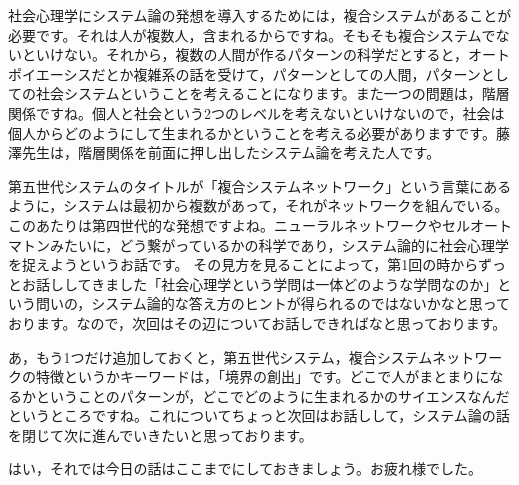 \documentclass{ltjsbook}
\begin{document}
社会心理学にシステム論の発想を導入するためには，複合システムがあることが必要です。それは人が複数人，含まれるからですね。そもそも複合システムでないといけない。それから，複数の人間が作るパターンの科学だとすると，オートポイエーシスだとか複雑系の話を受けて，パターンとしての人間，パターンとしての社会システムということを考えることになります。また一つの問題は，階層関係ですね。個人と社会という2つのレベルを考えないといけないので，社会は個人からどのようにして生まれるかということを考える必要がありますです。藤澤先生は，階層関係を前面に押し出したシステム論を考えた人です。

第五世代システムのタイトルが「複合システムネットワーク」という言葉にあるように，システムは最初から複数があって，それがネットワークを組んでいる。このあたりは第四世代的な発想ですよね。ニューラルネットワークやセルオートマトンみたいに，どう繋がっているかの科学であり，システム論的に社会心理学を捉えようというお話です。
その見方を見ることによって，第1回の時からずっとお話ししてきました「社会心理学という学問は一体どのような学問なのか」という問いの，システム論的な答え方のヒントが得られるのではないかなと思っております。なので，次回はその辺についてお話しできればなと思っております。

あ，もう1つだけ追加しておくと，第五世代システム，複合システムネットワークの特徴というかキーワードは，「境界の創出」です。どこで人がまとまりになるかということのパターンが，どこでどのように生まれるかのサイエンスなんだというところですね。これについてちょっと次回はお話しして，システム論の話を閉じて次に進んでいきたいと思っております。

はい，それでは今日の話はここまでにしておきましょう。お疲れ様でした。

\printbibliography[title=引用文献]
\end{document}
